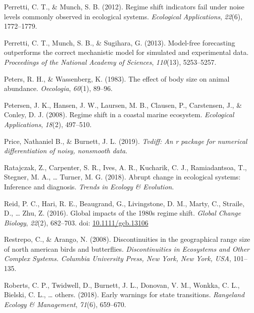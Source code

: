 \documentclass[12pt,twoside,openany]{reedthesis}
\begin{document}
\leavevmode\hypertarget{ref-perretti2012regime}{}%
Perretti, C. T., \& Munch, S. B. (2012). Regime shift indicators fail under noise levels commonly observed in ecological systems. \emph{Ecological Applications}, \emph{22}(6), 1772--1779.

\leavevmode\hypertarget{ref-perretti_model-free_2013}{}%
Perretti, C. T., Munch, S. B., \& Sugihara, G. (2013). Model-free forecasting outperforms the correct mechanistic model for simulated and experimental data. \emph{Proceedings of the National Academy of Sciences}, \emph{110}(13), 5253--5257.

\leavevmode\hypertarget{ref-peters1983effect}{}%
Peters, R. H., \& Wassenberg, K. (1983). The effect of body size on animal abundance. \emph{Oecologia}, \emph{60}(1), 89--96.

\leavevmode\hypertarget{ref-petersen2008regime}{}%
Petersen, J. K., Hansen, J. W., Laursen, M. B., Clausen, P., Carstensen, J., \& Conley, D. J. (2008). Regime shift in a coastal marine ecosystem. \emph{Ecological Applications}, \emph{18}(2), 497--510.

\leavevmode\hypertarget{ref-price2019tvdiff}{}%
Price, Nathaniel B., \& Burnett, J. L. (2019). \emph{Tvdiff: An r package for numerical differentiation of noisy, nonsmooth data}.

\leavevmode\hypertarget{ref-ratajczak2018abrupt}{}%
Ratajczak, Z., Carpenter, S. R., Ives, A. R., Kucharik, C. J., Ramiadantsoa, T., Stegner, M. A., \ldots{} Turner, M. G. (2018). Abrupt change in ecological systems: Inference and diagnosis. \emph{Trends in Ecology \& Evolution}.

\leavevmode\hypertarget{ref-reid_global_2016}{}%
Reid, P. C., Hari, R. E., Beaugrand, G., Livingstone, D. M., Marty, C., Straile, D., \ldots{} Zhu, Z. (2016). Global impacts of the 1980s regime shift. \emph{Global Change Biology}, \emph{22}(2), 682--703. doi: \href{https://doi.org/10.1111/gcb.13106}{10.1111/gcb.13106}

\leavevmode\hypertarget{ref-restrepo2008discontinuities}{}%
Restrepo, C., \& Arango, N. (2008). Discontinuities in the geographical range size of north american birds and butterflies. \emph{Discontinuities in Ecosystems and Other Complex Systems. Columbia University Press, New York, New York, USA}, 101--135.

\leavevmode\hypertarget{ref-roberts2018early}{}%
Roberts, C. P., Twidwell, D., Burnett, J. L., Donovan, V. M., Wonkka, C. L., Bielski, C. L., \ldots{} others. (2018). Early warnings for state transitions. \emph{Rangeland Ecology \& Management}, \emph{71}(6), 659--670.
\end{document}
